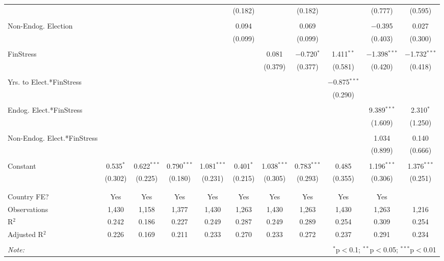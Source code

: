 \begin{table}[!htbp]
\begin{tabular}{@{\extracolsep{5pt}}lcccccccccc}
  &  &  &  &  & (0.182) &  & (0.182) &  & (0.777) & (0.595) \\ 
  & & & & & & & & & & \\ 
 Non-Endog. Election &  &  &  &  & 0.094 &  & 0.069 &  & $-$0.395 & 0.027 \\ 
  &  &  &  &  & (0.099) &  & (0.099) &  & (0.403) & (0.300) \\ 
  & & & & & & & & & & \\ 
 FinStress &  &  &  &  &  & 0.081 & $-$0.720$^{*}$ & 1.411$^{**}$ & $-$1.398$^{***}$ & $-$1.732$^{***}$ \\ 
  &  &  &  &  &  & (0.379) & (0.377) & (0.581) & (0.420) & (0.418) \\ 
  & & & & & & & & & & \\ 
 Yrs. to Elect.*FinStress &  &  &  &  &  &  &  & $-$0.875$^{***}$ &  &  \\ 
  &  &  &  &  &  &  &  & (0.290) &  &  \\ 
  & & & & & & & & & & \\ 
 Endog. Elect.*FinStress &  &  &  &  &  &  &  &  & 9.389$^{***}$ & 2.310$^{*}$ \\ 
  &  &  &  &  &  &  &  &  & (1.609) & (1.250) \\ 
  & & & & & & & & & & \\ 
 Non-Endog. Elect.*FinStress &  &  &  &  &  &  &  &  & 1.034 & 0.140 \\ 
  &  &  &  &  &  &  &  &  & (0.899) & (0.666) \\ 
  & & & & & & & & & & \\ 
 Constant & 0.535$^{*}$ & 0.622$^{***}$ & 0.790$^{***}$ & 1.081$^{***}$ & 0.401$^{*}$ & 1.038$^{***}$ & 0.783$^{***}$ & 0.485 & 1.196$^{***}$ & 1.376$^{***}$ \\ 
  & (0.302) & (0.225) & (0.180) & (0.231) & (0.215) & (0.305) & (0.293) & (0.355) & (0.306) & (0.251) \\ 
  & & & & & & & & & & \\ 
\hline \\[-1.8ex] 
Country FE? & Yes & Yes & Yes & Yes & Yes & Yes & Yes & Yes & Yes &  \\ 
Observations & 1,430 & 1,158 & 1,377 & 1,430 & 1,263 & 1,430 & 1,263 & 1,430 & 1,263 & 1,216 \\ 
R$^{2}$ & 0.242 & 0.186 & 0.227 & 0.249 & 0.287 & 0.249 & 0.289 & 0.254 & 0.309 & 0.254 \\ 
Adjusted R$^{2}$ & 0.226 & 0.169 & 0.211 & 0.233 & 0.270 & 0.233 & 0.272 & 0.237 & 0.291 & 0.234 \\ 
\hline 
\hline \\[-1.8ex] 
\textit{Note:}  & \multicolumn{10}{r}{$^{*}$p$<$0.1; $^{**}$p$<$0.05; $^{***}$p$<$0.01} \\ 
\end{tabular} 
\end{table} 
